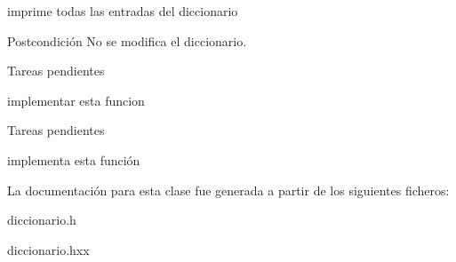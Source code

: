 imprime todas las entradas del diccionario 

\begin{DoxyPostcond}{\-Postcondición}
\-No se modifica el diccionario. 
\end{DoxyPostcond}
\begin{DoxyRefDesc}{\-Tareas pendientes}
\item[\hyperlink{todo__todo000001}{\-Tareas pendientes}]implementar esta funcion \end{DoxyRefDesc}


\begin{DoxyRefDesc}{\-Tareas pendientes}
\item[\hyperlink{todo__todo000011}{\-Tareas pendientes}]implementa esta función \end{DoxyRefDesc}


\-La documentación para esta clase fue generada a partir de los siguientes ficheros\-:\begin{DoxyCompactItemize}
\item 
diccionario.\-h\item 
diccionario.\-hxx\end{DoxyCompactItemize}
